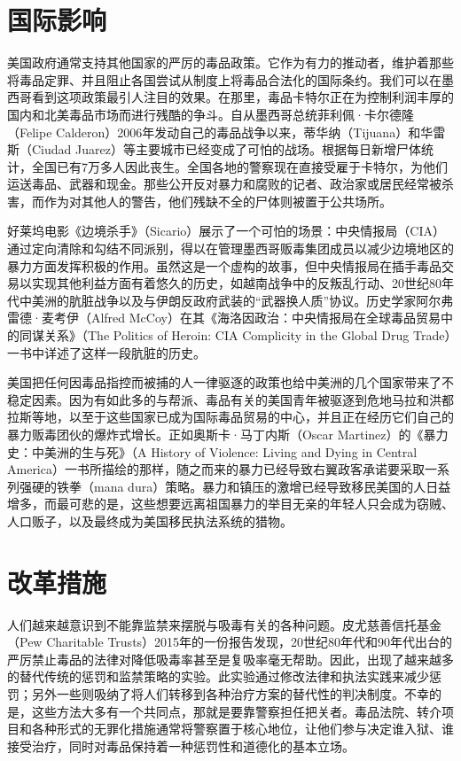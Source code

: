\documentclass[fontset=fandol, a4paper, 12pt, openright]{ctexbook}
\begin{document}
\section{国际影响}

美国政府通常支持其他国家的严厉的毒品政策。它作为有力的推动者，维护着那些将毒品定罪、并且阻止各国尝试从制度上将毒品合法化的国际条约。我们可以在墨西哥看到这项政策最引人注目的效果。在那里，毒品卡特尔正在为控制利润丰厚的国内和北美毒品市场而进行残酷的争斗。自从墨西哥总统菲利佩·卡尔德隆（Felipe Calderon）2006年发动自己的毒品战争以来，蒂华纳（Tijuana）和华雷斯（Ciudad Juarez）等主要城市已经变成了可怕的战场。根据每日新增尸体统计，全国已有7万多人因此丧生。全国各地的警察现在直接受雇于卡特尔，为他们运送毒品、武器和现金。那些公开反对暴力和腐败的记者、政治家或居民经常被杀害，而作为对其他人的警告，他们残缺不全的尸体则被置于公共场所。

好莱坞电影《边境杀手》（Sicario）展示了一个可怕的场景：中央情报局（CIA）通过定向清除和勾结不同派别，得以在管理墨西哥贩毒集团成员以减少边境地区的暴力方面发挥积极的作用。虽然这是一个虚构的故事，但中央情报局在插手毒品交易以实现其他利益方面有着悠久的历史，如越南战争中的反叛乱行动、20世纪80年代中美洲的肮脏战争以及与伊朗反政府武装的“武器换人质”协议。历史学家阿尔弗雷德·麦考伊（Alfred McCoy）在其《海洛因政治：中央情报局在全球毒品贸易中的同谋关系》（The Politics of Heroin: CIA Complicity in the Global Drug Trade）一书中详述了这样一段肮脏的历史。

美国把任何因毒品指控而被捕的人一律驱逐的政策也给中美洲的几个国家带来了不稳定因素。因为有如此多的与帮派、毒品有关的美国青年被驱逐到危地马拉和洪都拉斯等地，以至于这些国家已成为国际毒品贸易的中心，并且正在经历它们自己的暴力贩毒团伙的爆炸式增长。正如奥斯卡·马丁内斯（Oscar Martinez）的《暴力史：中美洲的生与死》（A History of Violence: Living and Dying in Central America）一书所描绘的那样，随之而来的暴力已经导致右翼政客承诺要采取一系列强硬的铁拳（mana dura）策略。暴力和镇压的激增已经导致移民美国的人日益增多，而最可悲的是，这些想要远离祖国暴力的举目无亲的年轻人只会成为窃贼、人口贩子，以及最终成为美国移民执法系统的猎物。

\section{改革措施}

人们越来越意识到不能靠监禁来摆脱与吸毒有关的各种问题。皮尤慈善信托基金（Pew Charitable Trusts）2015年的一份报告发现，20世纪80年代和90年代出台的严厉禁止毒品的法律对降低吸毒率甚至是复吸率毫无帮助。因此，出现了越来越多的替代传统的惩罚和监禁策略的实验。此实验通过修改法律和执法实践来减少惩罚；另外一些则吸纳了将人们转移到各种治疗方案的替代性的判决制度。不幸的是，这些方法大多有一个共同点，那就是要靠警察担任把关者。毒品法院、转介项目和各种形式的无罪化措施通常将警察置于核心地位，让他们参与决定谁入狱、谁接受治疗，同时对毒品保持着一种惩罚性和道德化的基本立场。
\end{document}
